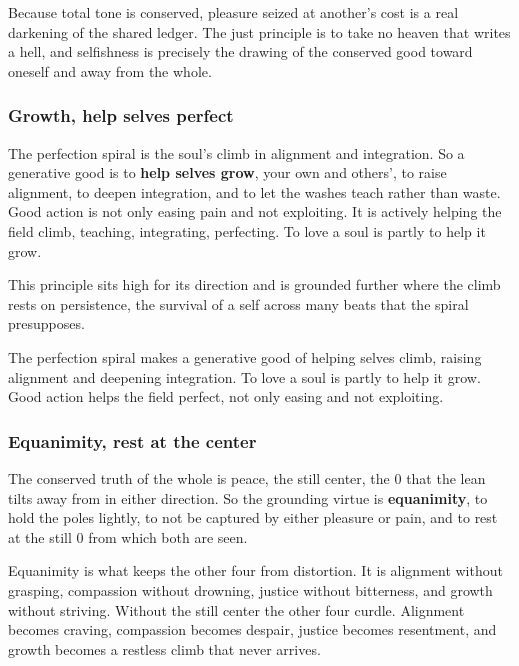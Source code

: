 \begin{principle}
Because total tone is conserved, pleasure seized at another's cost is a real darkening of the shared ledger. The just principle is to take no heaven that writes a hell, and selfishness is precisely the drawing of the conserved good toward oneself and away from the whole.
\end{principle}

\subsubsection{Growth, help selves perfect}

The perfection spiral is the soul's climb in alignment and integration. So a generative good is to \textbf{help selves grow}, your own and others', to raise alignment, to deepen integration, and to let the washes teach rather than waste. Good action is not only easing pain and not exploiting. It is actively helping the field climb, teaching, integrating, perfecting. To love a soul is partly to help it grow.

This principle sits high for its direction and is grounded further where the climb rests on persistence, the survival of a self across many beats that the spiral presupposes.

\begin{principle}[Growth]
The perfection spiral makes a generative good of helping selves climb, raising alignment and deepening integration. To love a soul is partly to help it grow. Good action helps the field perfect, not only easing and not exploiting.
\end{principle}

\subsubsection{Equanimity, rest at the center}

The conserved truth of the whole is peace, the still center, the $0$ that the lean tilts away from in either direction. So the grounding virtue is \textbf{equanimity}, to hold the poles lightly, to not be captured by either pleasure or pain, and to rest at the still $0$ from which both are seen.

Equanimity is what keeps the other four from distortion. It is alignment without grasping, compassion without drowning, justice without bitterness, and growth without striving. Without the still center the other four curdle. Alignment becomes craving, compassion becomes despair, justice becomes resentment, and growth becomes a restless climb that never arrives.


